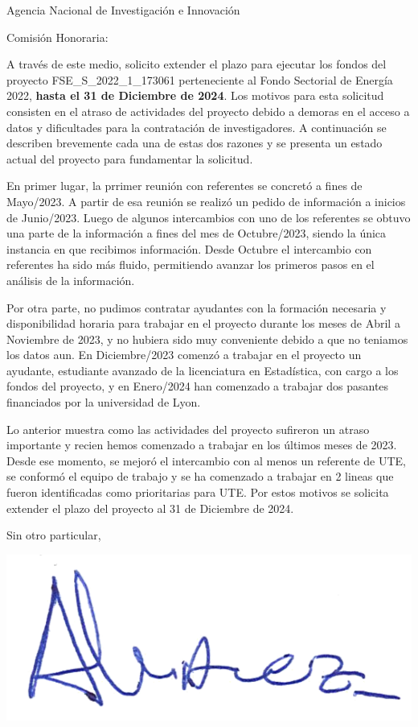 \documentclass{letter}\usepackage[]{graphicx}\usepackage[]{xcolor}
\date{Montevideo, 31 de Enero de 2024}
\begin{document}
\begin{letter}{Agencia Nacional de Investigación e Innovación}
\opening{Comisión Honoraria:}

A través de este medio, solicito extender el plazo para ejecutar los fondos del proyecto FSE\_S\_2022\_1\_173061 perteneciente al Fondo Sectorial de Energía 2022, \textbf{hasta el 31 de Diciembre de 2024}. Los motivos para esta solicitud consisten en el atraso de actividades del proyecto debido a demoras en el acceso a datos y dificultades para la contratación de investigadores. A continuación se describen brevemente cada una de estas dos razones y se presenta un estado actual del proyecto para fundamentar la solicitud. 

En primer lugar, la prrimer reunión con referentes se concretó a fines de Mayo/2023. A partir de esa reunión se realizó un pedido de información a inicios de Junio/2023. Luego de algunos intercambios con uno de los referentes se obtuvo una parte de la información a fines del mes de Octubre/2023, siendo la única instancia en que recibimos información. Desde Octubre el intercambio con referentes ha sido más fluido, permitiendo avanzar los primeros pasos en el análisis de la información. 

Por otra parte, no pudimos contratar ayudantes con la formación necesaria y disponibilidad horaria para trabajar en el proyecto durante los meses de Abril a Noviembre de 2023, y no hubiera sido muy conveniente debido a que no teniamos los datos aun. En Diciembre/2023 comenzó a trabajar en el proyecto un ayudante, estudiante avanzado de la licenciatura en Estadística, con cargo a los fondos del proyecto, y en Enero/2024 han comenzado a trabajar dos pasantes financiados por la universidad de Lyon.  

Lo anterior muestra como las actividades del proyecto sufireron un atraso importante y recien hemos comenzado a trabajar en los últimos meses de 2023. Desde ese momento, se mejoró el intercambio con al menos un referente de UTE, se conformó el equipo de trabajo y se ha comenzado a trabajar en 2 lineas que fueron identificadas como prioritarias para UTE. Por estos motivos se solicita extender el plazo del proyecto al 31 de Diciembre de 2024. 


\closing{Sin otro particular,}
\begin{center}
\includegraphics[scale=.5]{../firma_nacho}
\end{center}

\end{letter}
\end{document}
